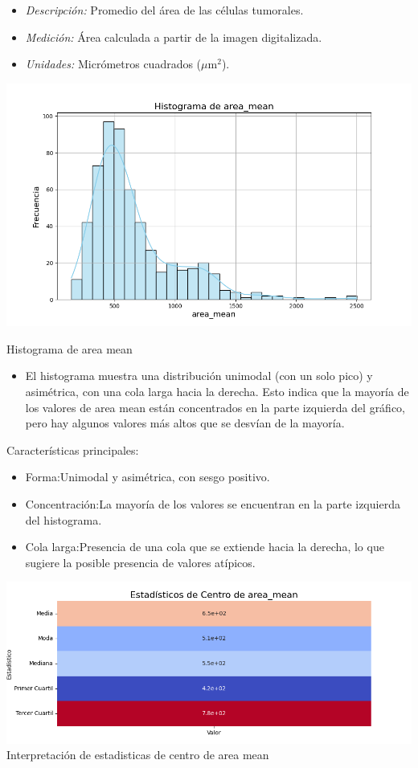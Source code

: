 \documentclass[a4paper, 12pt]{article}
\begin{document}
 \begin{itemize}
	\item \textit{Descripción:} Promedio del área de las células tumorales.
	\item \textit{Medición:} Área calculada a partir de la imagen digitalizada.
	\item \textit{Unidades:} Micrómetros cuadrados ($\mu$m$^2$).
\end{itemize}

\includegraphics[width=\textwidth]{../Plots/plots_stats/area_mean/histograma_area_mean.png}

Histograma de area mean

\begin{itemize}
\item El histograma muestra una distribución unimodal (con un solo pico) y asimétrica, con una cola larga hacia la derecha. Esto indica que la mayoría de los valores de area mean están concentrados en la parte izquierda del gráfico, pero hay algunos valores más altos que se desvían de la mayoría.
\end{itemize}

Características principales:

\begin{itemize}
\item Forma:Unimodal y asimétrica, con sesgo positivo.
\item Concentración:La mayoría de los valores se encuentran en la parte izquierda del histograma.
\item Cola larga:Presencia de una cola que se extiende hacia la derecha, lo que sugiere la posible presencia de valores atípicos.
\end{itemize}

\includegraphics[width=\textwidth]{../Plots/plots_stats/area_mean/estadisticas_centro_area_mean.png}
Interpretación de estadisticas de centro de area mean
\end{document}
